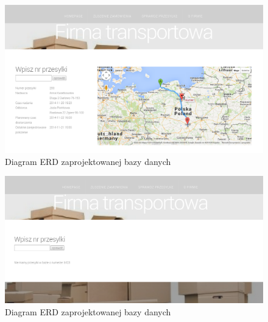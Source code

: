 \documentclass[eng,printmode,oneside]{mgr}
\begin{document}
\begin{figure}[ht!]
\centering
\includegraphics[width=90ex]{przyklad.png}
\caption{Diagram ERD zaprojektowanej bazy danych}
\label{pokaz}
\end{figure}

\begin{figure}[ht!]
\centering
\includegraphics[width=90ex]{nieMaPrzesylki.png}
\caption{Diagram ERD zaprojektowanej bazy danych}
\label{niema}
\end{figure}
\end{document}
